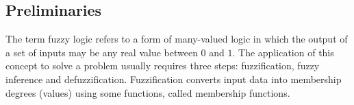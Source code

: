 \documentclass[review]{elsarticle}
\begin{document}
\subsection{Preliminaries}
The term fuzzy logic refers to a form of many-valued logic in which the output of a set of inputs may be any real value between $0$ and $1$. The application of this concept to solve a problem usually requires three steps: fuzzification, fuzzy inference and defuzzification. Fuzzification converts input data into membership degrees (values) using some functions, called membership functions. %
\end{document}

